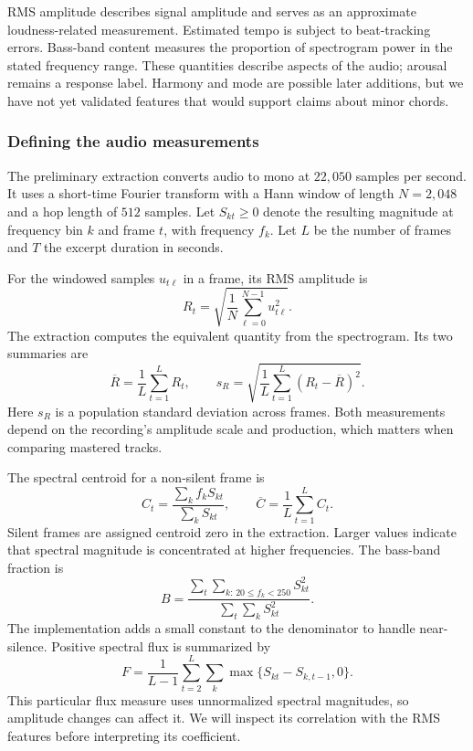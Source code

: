 RMS amplitude describes signal amplitude and serves as an approximate loudness-related measurement. Estimated tempo is subject to beat-tracking errors. Bass-band content measures the proportion of spectrogram power in the stated frequency range. These quantities describe aspects of the audio; arousal remains a response label. Harmony and mode are possible later additions, but we have not yet validated features that would support claims about minor chords.

\subsubsection{Defining the audio measurements}

The preliminary extraction converts audio to mono at $22{,}050$ samples per second. It uses a short-time Fourier transform with a Hann window of length $N=2{,}048$ and a hop length of $512$ samples. Let $S_{kt}\geq0$ denote the resulting magnitude at frequency bin $k$ and frame $t$, with frequency $f_k$. Let $L$ be the number of frames and $T$ the excerpt duration in seconds.

For the windowed samples $u_{t\ell}$ in a frame, its RMS amplitude is
\begin{equation}
 R_t=\sqrt{\frac{1}{N}\sum_{\ell=0}^{N-1}u_{t\ell}^2}.
\end{equation}
The extraction computes the equivalent quantity from the spectrogram. Its two summaries are
\begin{equation}
 \overline R=\frac{1}{L}\sum_{t=1}^{L}R_t,
 \qquad
 s_R=\sqrt{\frac{1}{L}\sum_{t=1}^{L}(R_t-\overline R)^2}.
\end{equation}
Here $s_R$ is a population standard deviation across frames. Both measurements depend on the recording's amplitude scale and production, which matters when comparing mastered tracks.

The spectral centroid for a non-silent frame is
\begin{equation}
 C_t=\frac{\sum_k f_k S_{kt}}{\sum_k S_{kt}},
 \qquad \overline C=\frac{1}{L}\sum_{t=1}^{L}C_t.
\end{equation}
Silent frames are assigned centroid zero in the extraction. Larger values indicate that spectral magnitude is concentrated at higher frequencies. The bass-band fraction is
\begin{equation}
 B=\frac{\sum_t\sum_{k:\,20\leq f_k<250}S_{kt}^2}
 {\sum_t\sum_k S_{kt}^2}.
\end{equation}
The implementation adds a small constant to the denominator to handle near-silence. Positive spectral flux is summarized by
\begin{equation}
 F=\frac{1}{L-1}\sum_{t=2}^{L}\sum_k
 \max\{S_{kt}-S_{k,t-1},0\}.
\end{equation}
This particular flux measure uses unnormalized spectral magnitudes, so amplitude changes can affect it. We will inspect its correlation with the RMS features before interpreting its coefficient.

